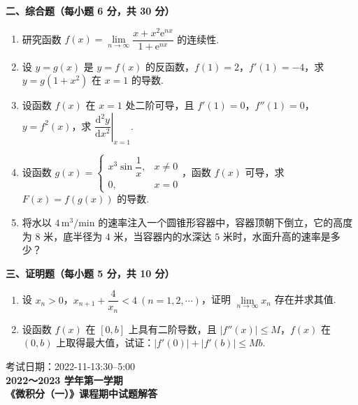 \documentclass[a4paper,11pt]{ctexart}
\newcommand{\e}{\mathrm{e}}
\newcommand{\dd}{\mathrm{d}}
\begin{document}
\vspace{0.9em}

\textbf{二、综合题（每小题 6 分，共 30 分）}

\begin{enumerate}[label=\arabic*., start=11, leftmargin=2em, itemsep=0.95em, topsep=0.5em]
  \item 研究函数 $f(x) = \lim\limits_{n\to\infty}\dfrac{x + x^2 \e^{nx}}{1 + \e^{nx}}$ 的连续性.

  \item 设 $y = g(x)$ 是 $y = f(x)$ 的反函数，$f(1) = 2$，$f'(1) = -4$，求 $y = g(1+x^2)$ 在 $x = 1$ 的导数.

  \item 设函数 $f(x)$ 在 $x = 1$ 处二阶可导，且 $f'(1) = 0$，$f''(1) = 0$，$y = f^2(x)$，求 $\left.\dfrac{\dd^2 y}{\dd x^2}\right|_{x=1}$.

  \item 设函数 $g(x) = \begin{cases} x^3 \sin\dfrac{1}{x}, & x\neq 0 \\[0.4em] 0, & x = 0 \end{cases}$，函数 $f(x)$ 可导，求 $F(x) = f(g(x))$ 的导数.

  \item 将水以 $4\,\mathrm{m}^3/\mathrm{min}$ 的速率注入一个圆锥形容器中，容器顶朝下倒立，它的高度为 $8$ 米，底半径为 $4$ 米，当容器内的水深达 $5$ 米时，水面升高的速率是多少？
\end{enumerate}

\vspace{0.9em}

\textbf{三、证明题（每小题 5 分，共 10 分）}

\begin{enumerate}[label=\arabic*., start=16, leftmargin=2em, itemsep=0.95em, topsep=0.5em]
  \item 设 $x_n > 0$，$x_{n+1} + \dfrac{4}{x_n} < 4~(n = 1, 2, \cdots)$，证明 $\lim\limits_{n\to\infty} x_n$ 存在并求其值.

  \item 设函数 $f(x)$ 在 $[0, b]$ 上具有二阶导数，且 $|f''(x)| \le M$，$f(x)$ 在 $(0, b)$ 上取得最大值，试证：$|f'(0)| + |f'(b)| \le Mb$.
\end{enumerate}

\newpage

\begin{center}
  {\small 考试日期：2022-11-13:30--5:00}\\[0.6em]
  {\Large\bfseries 2022～2023 学年第一学期}\\[0.4em]
  {\Large\bfseries 《微积分（一）》课程期中试题解答}
\end{center}
\end{document}
